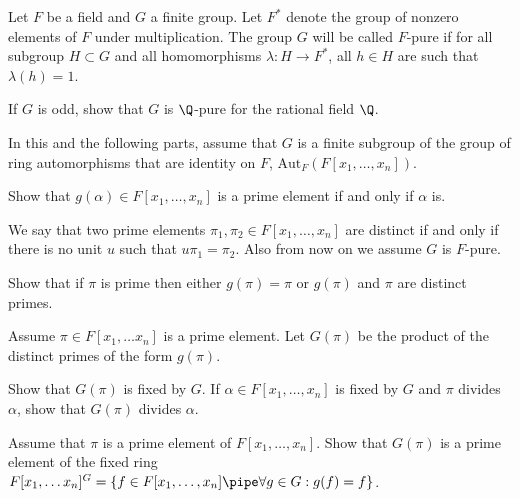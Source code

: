 Let $F$ be a field and $G$ a finite group. Let $F^*$ denote the group
of nonzero elements of $F$ under multiplication. The group $G$ will be
called $F$-pure if for all subgroup $H\subset G$ and all homomorphisms
$\lambda:H\rightarrow F^*$, all $h\in H$ are such that $\lambda(h)=1$.
\begin{alist}
\item If $G$ is odd, show that $G$ is $\Q$-pure for the rational field
$\Q$.
\item In this and the following parts, assume that $G$ is a finite
subgroup of the group of ring automorphisms that are identity on $F$,
$\mathrm{Aut}_F(F[x_1,\ldots ,x_n])$.

Show that $g(\alpha)\in F[x_1,\ldots ,x_n]$ is a prime element if and
only if $\alpha$ is.
\item We say that two prime elements $\pi_1,\pi_2\in F[x_1,\ldots ,x_n]$
are distinct if and only if there is no unit $u$ such that
$u\pi_1=\pi_2$.  Also from now on we assume $G$ is $F$-pure.

Show that if $\pi$ is prime then either $g(\pi)=\pi$ or $g(\pi)$ and
$\pi$ are distinct primes.
\item Assume $\pi\in F[x_1,\ldots x_n]$ is a prime element. Let
$G(\pi)$ be the product of the distinct primes of the form $g(\pi)$.

Show that $G(\pi)$ is fixed by $G$. If $\alpha\in F[x_1,\ldots ,x_n]$
is fixed by $G$ and $\pi$ divides $\alpha$, show that $G(\pi)$ divides
$\alpha$.
\item Assume that $\pi$ is a prime element of $F[x_1,\ldots ,x_n]$. 
Show that $G(\pi)$ is a prime element of the fixed ring $F[x_1,\ldots
x_n]^G=\{f\in F[x_1,\ldots ,x_n]\pipe \forall g\in G:g(f)=f\}$.
\end{alist}
